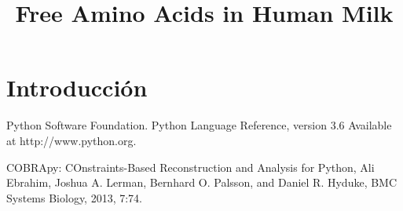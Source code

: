 \documentclass[12pt]{article}
\title{Free Amino Acids in Human Milk}
\begin{document}
\maketitle

\begin{abstract}
\end{abstract}

\section{Introducción}






\begin{thebibliography}{1}

 Python Software Foundation. Python Language Reference, version 3.6 Available at http://www.python.org.

 COBRApy: COnstraints-Based Reconstruction and Analysis for Python,
Ali Ebrahim, Joshua A. Lerman, Bernhard O. Palsson, and Daniel R. Hyduke,
BMC Systems Biology, 2013, 7:74.

\end{thebibliography}
\end{document}
